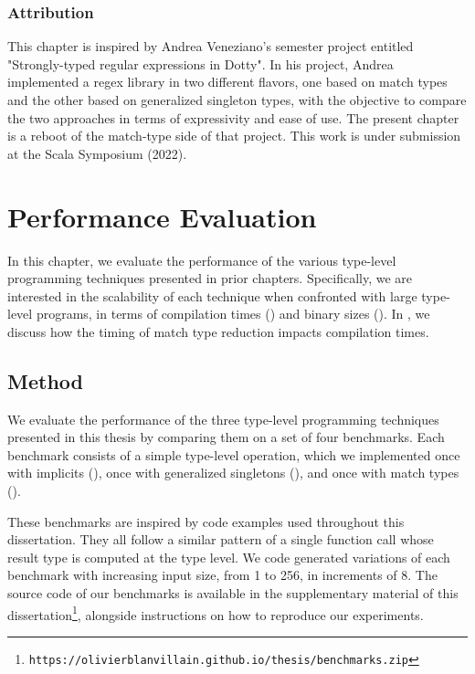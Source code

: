 \subsection*{Attribution}

This chapter is inspired by Andrea Veneziano's semester project entitled "Strongly-typed regular expressions in Dotty".
In his project, Andrea implemented a regex library in two different flavors, one based on match types and the other based on generalized singleton types, with the objective to compare the two approaches in terms of expressivity and ease of use.
The present chapter is a reboot of the match-type side of that project.
This work is under submission at the Scala Symposium (2022).

\newcommand\thesisOnly[1]{#1}
\newcommand\paperOnly[1]{}


\chapter{Performance Evaluation}
\label{chap:performance-evaluation}

In this chapter, we evaluate the performance of the various type-level programming techniques presented in prior chapters.
Specifically, we are interested in the scalability of each technique when confronted with large type-level programs, in terms of compilation times () and binary sizes ().
In , we discuss how the timing of match type reduction impacts compilation times.

\section{Method}

We evaluate the performance of the three type-level programming techniques presented in this thesis by comparing them on a set of four benchmarks.
Each benchmark consists of a simple type-level operation, which we implemented once with implicits (), once with generalized singletons (), and once with match types ().

These benchmarks are inspired by code examples used throughout this dissertation. They all follow a similar pattern of a single function call whose result type is computed at the type level. We code generated variations of each benchmark with increasing input size, from 1 to 256, in increments of 8.
The source code of our benchmarks is available in the supplementary material of this dissertation\footnote{\texttt{https://olivierblanvillain.github.io/thesis/benchmarks.zip}}, alongside instructions on how to reproduce our experiments.


